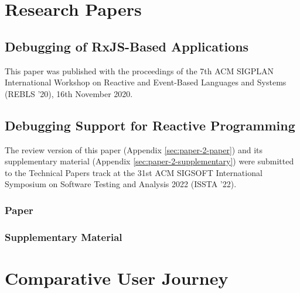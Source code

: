 \appendix

\section{Research Papers \label{sec:research-papers}}

\subsection{Debugging of RxJS-Based Applications \label{sec:paper-1}}

This paper was published with the proceedings of the 7th ACM SIGPLAN International Workshop
on Reactive and Event-Based Languages and Systems (REBLS '20), 16th November 2020.










\subsection{Debugging Support for Reactive Programming \label{sec:paper-2}}

The review version of this paper (Appendix \ref{sec:paper-2-paper}) and its supplementary material
(Appendix \ref{sec:paper-2-supplementary}) were submitted to the Technical Papers track at the 31st ACM SIGSOFT
International Symposium on Software Testing and Analysis 2022 (ISSTA '22).

\subsubsection{Paper \label{sec:paper-2-paper}}


\subsubsection{Supplementary Material \label{sec:paper-2-supplementary}}













\section{Comparative User Journey \label{sec:user-journey}}

